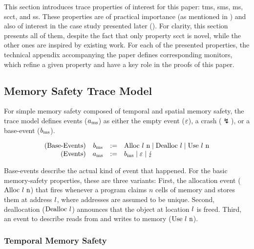 \documentclass[dvipsnames,conference]{IEEEtran}
\theoremstyle{definition}
\begin{document}
This section introduces trace properties of interest for this paper: \gls*{tms}, \gls*{sms}, \gls*{ms}, \gls*{scct}, and \gls*{ss}.
These properties are of practical importance (as mentioned in ) and also of interest in the case study presented later (). 
For clarity, this section presents all of them, despite the fact that only property \gls*{scct} is novel, while the other ones are inspired by existing work.
For each of the presented properties, the technical appendix accompanying the paper defines corresponding monitors, which refine a given property and have a key role in the proofs of this paper. 

\subsection{Memory Safety Trace Model}\label{subsec:basic:memsafety:tracemodel}

For simple memory safety composed of temporal and spatial memory safety, the trace model defines events ($\event[_{\mssafe}]$) as either the empty event ($\emptyevent$), a crash ($\lightning$), or a base-event ($\preevent[_{\mssafe}]$).

\vspace{-1.0em}
\[
  \begin{array}{rcll}
    \text{(Base-Events)}&\preevent[_{\mssafe}] &:=& \ev{Alloc \loc\ n} \mid \ev{Dealloc \loc} \mid \ev{Use \loc\ n} \\
    \text{(Events)}&\event[_{\mssafe}] &:=& \preevent[_{\mssafe}] \mid \emptyevent \mid \lightning \\ 
  \end{array}
\]

Base-events describe the actual kind of event that happened.
For the basic memory-safety properties, these are three variants:
First, the allocation event ($\ev{Alloc\ \loc\ n}$) that fires whenever a program claims $n$ cells of memory and stores them at address $\loc$, where addresses are assumed to be unique.
Second, deallocation ($\ev{Dealloc\ \loc}$) announces that the object at location $\loc$ is freed.
Third, an event to describe reads from and writes to memory ($\ev{Use\ \loc\ n}$).

\subsubsection{Temporal Memory Safety}
\end{document}

